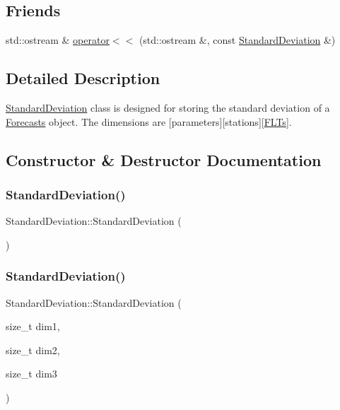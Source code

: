 \subsection*{Friends}
\begin{DoxyCompactItemize}
\item 
std\+::ostream \& \mbox{\hyperlink{class_standard_deviation_a983ad4d351fca4bad35c367110ba27e2}{operator$<$$<$}} (std\+::ostream \&, const \mbox{\hyperlink{class_standard_deviation}{Standard\+Deviation}} \&)
\end{DoxyCompactItemize}


\subsection{Detailed Description}
\mbox{\hyperlink{class_standard_deviation}{Standard\+Deviation}} class is designed for storing the standard deviation of a \mbox{\hyperlink{class_forecasts}{Forecasts}} object. The dimensions are \mbox{[}parameters\mbox{]}\mbox{[}stations\mbox{]}\mbox{[}\mbox{\hyperlink{class_f_l_ts}{F\+L\+Ts}}\mbox{]}. 

\subsection{Constructor \& Destructor Documentation}
\mbox{\label{class_standard_deviation_a526f8eb4fc84a43285d0ab3a8b03a601}} 
\subsubsection{\texorpdfstring{Standard\+Deviation()}{StandardDeviation()}\hspace{0.1cm}{\footnotesize\ttfamily [1/3]}}
{\footnotesize\ttfamily Standard\+Deviation\+::\+Standard\+Deviation (\begin{DoxyParamCaption}{ }\end{DoxyParamCaption})}

\mbox{\label{class_standard_deviation_a06f6311463d5386e8c6808582b383541}} 
\subsubsection{\texorpdfstring{Standard\+Deviation()}{StandardDeviation()}\hspace{0.1cm}{\footnotesize\ttfamily [2/3]}}
{\footnotesize\ttfamily Standard\+Deviation\+::\+Standard\+Deviation (\begin{DoxyParamCaption}\item[{size\+\_\+t}]{dim1,  }\item[{size\+\_\+t}]{dim2,  }\item[{size\+\_\+t}]{dim3 }\end{DoxyParamCaption})}

